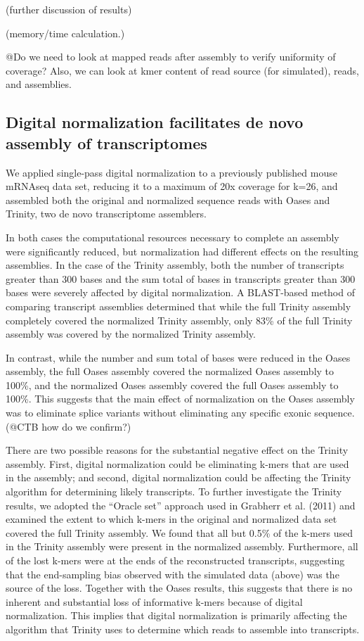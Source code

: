 \documentclass[10pt,draft]{article}
\begin{document}
(further discussion of results)

(memory/time calculation.)

@Do we need to look at mapped reads after assembly to verify uniformity
of coverage? Also, we can look at kmer content of read source (for
simulated), reads, and assemblies.

\subsection*{Digital normalization facilitates de novo assembly of transcriptomes}

We applied single-pass digital normalization to a previously published
mouse mRNAseq data set, reducing it to a maximum of 20x coverage for
k=26, and assembled both the original and normalized sequence reads
with Oases and Trinity, two de novo transcriptome assemblers.

In both cases the computational resources necessary to complete an
assembly were significantly reduced, but normalization had different
effects on the resulting assemblies.  In the case of the Trinity
assembly, both the number of transcripts greater than 300 bases and
the sum total of bases in transcripts greater than 300 bases were
severely affected by digital normalization.  A BLAST-based method of
comparing transcript assemblies determined that while the full Trinity assembly
completely covered the normalized Trinity assembly, only 83\% of the
full Trinity assembly was covered by the normalized Trinity assembly.

In contrast, while the number and sum total of bases were reduced in
the Oases assembly, the full Oases assembly covered the normalized
Oases assembly to 100\%, and the normalized Oases assembly covered the
full Oases assembly to 100\%.  This suggests that the main effect of
normalization on the Oases assembly was to eliminate splice variants
without eliminating any specific exonic sequence. (@CTB how do we confirm?)

There are two possible reasons for the substantial negative effect on
the Trinity assembly.  First, digital normalization could be
eliminating k-mers that are used in the assembly; and second, digital
normalization could be affecting the Trinity algorithm for determining
likely transcripts.  To further investigate the Trinity results, we
adopted the ``Oracle set'' approach used in Grabherr et al. (2011) and
examined the extent to which k-mers in the original and normalized
data set covered the full Trinity assembly.  We found that all but
0.5\% of the k-mers used in the Trinity assembly were present in the
normalized assembly.  Furthermore, all of the lost k-mers were at the
ends of the reconstructed transcripts, suggesting that the
end-sampling bias observed with the simulated data (above) was the
source of the loss.  Together with the Oases results, this suggests
that there is no inherent and substantial loss of informative k-mers
because of digital normalization.  This implies that digital
normalization is primarily affecting the algorithm that Trinity uses
to determine which reads to assemble into transcripts.
\end{document}
